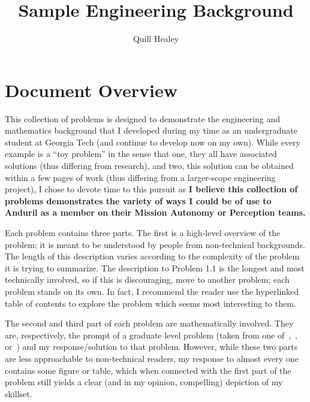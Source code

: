 \documentclass[12pt,reqno]{article}
\title{Sample Engineering Background}
\author{Quill Healey}
\theoremstyle{definition}
\numberwithin{equation}{section}
\begin{document}
\maketitle
\tableofcontents

\section*{Document Overview}
This collection of problems is designed to demonstrate the engineering and mathematics background
that I developed during my time as an undergraduate student at Georgia Tech (and continue to develop
now on my own). While every example is a ``toy problem'' in the sense that one,
they all have associated solutions (thus differing from research), and two, this solution can be obtained within a few pages of work
(thus differing from a larger-scope engineering project), I chose to devote time to this pursuit as \textbf{I
believe this collection of problems demonstrates the variety of ways I could be of use to Anduril
as a member on their Mission Autonomy or Perception teams. }

Each problem contains three parts. The first is a high-level overview of the problem; it is meant to
be understood by people from non-technical backgrounds. The length of this description varies according
to the complexity of the problem it is trying to summarize. The description to Problem 1.1 is the longest and most
technically involved, so if this is discouraging, move to another problem; each problem stands on its own.
In fact, I recommend the reader use the hyperlinked table of contents to explore the problem which seems
most interesting to them.

The second and third part of each problem are mathematically involved.
They are, respectively, the prompt of a graduate level problem (taken from one of~\cite{boyd_convex_optimization},~\cite{EE364b}, or~\cite{EE364a-extra}) and my response/solution to that problem.
However, while these two parts are less approachable to non-technical readers, my response to almost every one
contains some figure or table, which when connected with the first part of the problem still yields
a clear (and in my opinion, compelling) depiction of my skillset.
\end{document}
